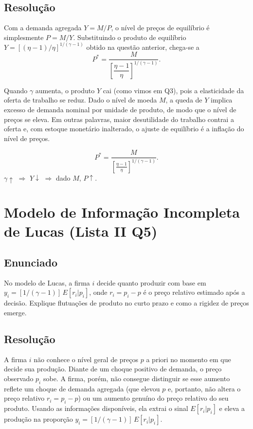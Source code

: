 \documentclass[12pt, a4paper]{article}
\begin{document}
\subsection*{Resolução}

Com a demanda agregada $Y = M/P$, o nível de preços de equilíbrio é simplesmente $P = M/Y$. Substituindo o produto de equilíbrio $Y = [(\eta-1)/\eta]^{1/(\gamma-1)}$ obtido na questão anterior, chega-se a
\[
P^* = \frac{M}{\left[\dfrac{\eta-1}{\eta}\right]^{1/(\gamma-1)}}.
\]

Quando $\gamma$ aumenta, o produto $Y$ cai (como vimos em Q3), pois a elasticidade da oferta de trabalho se reduz. Dado o nível de moeda $M$, a queda de $Y$ implica excesso de demanda nominal por unidade de produto, de modo que o nível de preços se eleva. Em outras palavras, maior desutilidade do trabalho contrai a oferta e, com estoque monetário inalterado, o ajuste de equilíbrio é a inflação do nível de preços.

\begin{resultbox}[title={Nível de Preços de Equilíbrio (Lista II Q4)}]
\[
P^* = \frac{M}{\left[\frac{\eta-1}{\eta}\right]^{1/(\gamma-1)}}.
\]
$\gamma\uparrow$ $\Rightarrow$ $Y\downarrow$ $\Rightarrow$ dado $M$, $P\uparrow$.
\end{resultbox}

\section{Modelo de Informação Incompleta de Lucas (Lista II Q5)}

\subsection*{Enunciado}
No modelo de Lucas, a firma $i$ decide quanto produzir com base em $y_i = [1/(\gamma-1)]\,E[r_i|p_i]$, onde $r_i = p_i - p$ é o preço relativo estimado após a decisão. Explique flutuações de produto no curto prazo e como a rigidez de preços emerge.

\subsection*{Resolução}

A firma $i$ não conhece o nível geral de preços $p$ a priori no momento em que decide sua produção. Diante de um choque positivo de demanda, o preço observado $p_i$ sobe. A firma, porém, não consegue distinguir se esse aumento reflete um choque de demanda agregada (que elevou $p$ e, portanto, não altera o preço relativo $r_i = p_i - p$) ou um aumento genuíno do preço relativo do seu produto. Usando as informações disponíveis, ela extrai o sinal $E[r_i|p_i]$ e eleva a produção na proporção $y_i = [1/(\gamma-1)]\,E[r_i|p_i]$.
\end{document}
